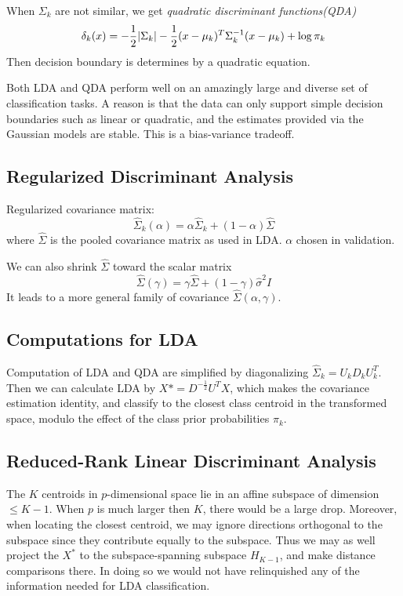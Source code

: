 When $\Sigma_k$ are not similar, we get \textit{quadratic discriminant functions(QDA)}
\begin{equation*}
\delta_k(x)=-\frac{1}{2}\abs{\Sigma_k}-\frac{1}{2}(x-\mu_k)^T\Sigma_k^{-1}(x-\mu_k)+\log\pi_k
\end{equation*}
Then decision boundary is determines by a quadratic equation. 

Both LDA and QDA perform well on an amazingly large and diverse set
of classification tasks. A reason is
that the data can only support simple decision boundaries such as linear or
quadratic, and the estimates provided via the Gaussian models are stable. 
This is a bias-variance tradeoff. 

\subsection{Regularized Discriminant Analysis}
Regularized covariance matrix: 
\begin{equation*}
\hat{\Sigma}_k(\alpha)=\alpha\hat{\Sigma}_k+(1-\alpha)\hat{\Sigma}
\end{equation*}
where $\hat{\Sigma}$ is the pooled covariance matrix as used in LDA. $\alpha$ 
chosen in validation. 

We can also shrink $\hat{\Sigma}$ toward the scalar matrix
\begin{equation*}
\hat{\Sigma}(\gamma)=\gamma\hat{\Sigma}+(1-\gamma)\hat{\sigma}^2I
\end{equation*}
It leads to a more general family of covariance $\hat{\Sigma}(\alpha,\gamma)$. 

\subsection{Computations for LDA}
Computation of LDA and QDA are simplified by diagonalizing $\hat{\Sigma}_k=U_kD_kU_k^T$. 
Then we can calculate LDA by $X*=D^{-\frac{1}{2}}U^TX$, which makes the covariance 
estimation identity, and classify to the closest class centroid in the transformed space, modulo
the effect of the class prior probabilities $\pi_k$. 

\subsection{Reduced-Rank Linear Discriminant Analysis}
The $K$ centroids in $p$-dimensional space lie in an affine subspace of dimension 
$\le K-1$. When $p$ is much larger then $K$, there would be a large drop. Moreover, 
when locating the closest centroid, we may ignore directions orthogonal to the subspace
since they contribute equally to the subspace. Thus we may as well project the $X^*$ 
to the subspace-spanning subspace $H_{K-1}$, and make distance comparisons there. 
In doing so we would not have relinquished any of the information needed for LDA 
classification.

